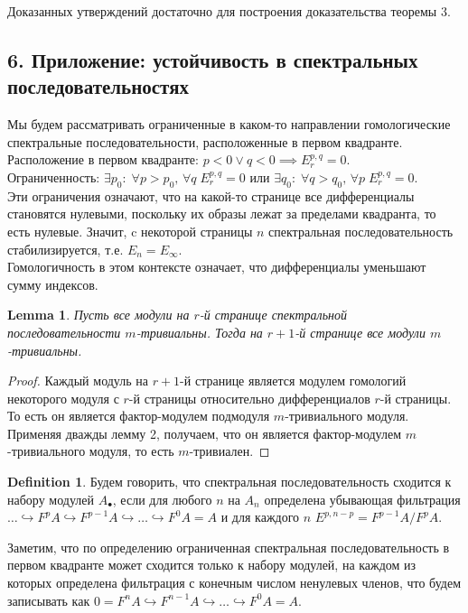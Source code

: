 \documentclass[a4paper, 12pt]{article}
\newtheorem{lemma}{Lemma}
\theoremstyle{definition}
\newtheorem{definition}{Definition}
\theoremstyle{remark}
\begin{document}
Доказанных утверждений достаточно для построения доказательства теоремы 3.

\subsection*{6. Приложение: устойчивость в спектральных последовательностях}
Мы будем рассматривать ограниченные в каком-то направлении гомологические спектральные последовательности, расположенные в первом квадранте.\\
Расположение в первом квадранте: $p < 0 \lor q < 0 \implies E_r^{p,q} = 0$.\\
Ограниченность: $\exists p_0:\;\forall p>p_0,\,\forall q\; E_r^{p,q} = 0$ или $\exists q_0:\;\forall q>q_0,\,\forall p\; E_r^{p,q} = 0$.\\
Эти ограничения означают, что на какой-то странице все дифференциалы становятся нулевыми, поскольку их образы лежат за пределами квадранта, то есть нулевые. Значит, c некоторой страницы $n$ спектральная последовательность стабилизируется, т.е. $E_n = E_{\infty}$.\\
Гомологичность в этом контексте означает, что дифференциалы уменьшают сумму индексов.\\

\begin{lemma}
  Пусть все модули на $r$-й странице спектральной последовательности $m$-тривиальны. Тогда на $r+1$-й странице все модули $m$-тривиальны.
\end{lemma}
\begin{proof}
  Каждый модуль на $r+1$-й странице является модулем гомологий некоторого модуля с $r$-й страницы относительно дифференциалов $r$-й страницы. То есть он является фактор-модулем подмодуля $m$-тривиального модуля. Применяя дважды лемму 2, получаем, что он является фактор-модулем $m$-тривиального модуля, то есть $m$-тривиален.
\end{proof}

\begin{definition}
  Будем говорить, что спектральная последовательность сходится к набору модулей $A_{\bullet}$,
  если для любого $n$ на $A_n$ определена убывающая фильтрация $\ldots \hookrightarrow  F^pA \hookrightarrow F^{p-1}A \hookrightarrow \ldots \hookrightarrow F^0A = A$ и для каждого $n$ $E^{p,n-p} = F^{p-1}A/F^pA$.
\end{definition}

Заметим, что по определению ограниченная спектральная последовательность в первом квадранте может сходится только к набору модулей, на каждом из которых определена фильтрация с конечным числом ненулевых членов, что будем записывать как $0 = F^nA \hookrightarrow F^{n-1}A \hookrightarrow \ldots \hookrightarrow F^0A = A$.
\end{document}
